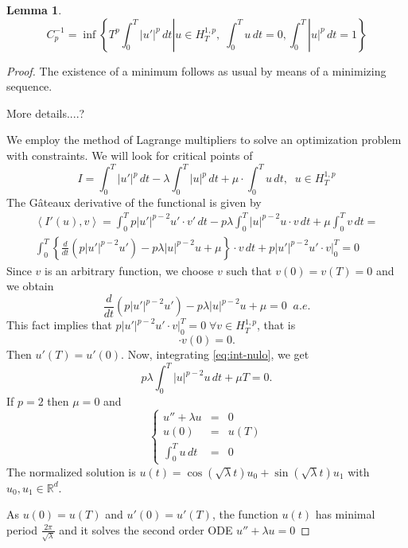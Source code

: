 \documentclass[twoside]{article}
\newtheorem{lem}[thm]{Lemma}
\theoremstyle{remark}
\newcommand{\rr}{\mathbb{R}}
\begin{document}
\begin{lem}
\begin{equation}
C_p^{-1}=\inf \left\{T^p \int_0^T |u'|^p\,dt | u\in H^{1,p}_T,\;\int_0^T u\,dt=0, 
\int_0^T |u|^p\,dt=1\right\}
\end{equation}
\end{lem}
\begin{proof}
The existence of a minimum follows as usual by means of a minimizing sequence. 

More details....?

We employ the method of Lagrange multipliers to solve an optimization problem with constraints. 
We will look for critical points of 
\begin{equation}
I=\int_0^T |u'|^p\,dt-\lambda \int_0^T |u|^p\,dt+\mu \cdot \int_0^T u\,dt,\;\; u\in H^{1,p}_T 
\end{equation}
The G\^ateaux derivative of the functional is given by
\begin{equation}
\begin{split}
\left\langle I'(u),v\right\rangle=
\int_0^T p |u'|^{p-2}u'\cdot v'\,dt-p\lambda \int_0^T |u|^{p-2}u\cdot v\,dt+ \mu \int_0^T v\,dt=
\\
\int_0^T \left\{\frac{d}{dt}(p |u'|^{p-2}u')-p\lambda |u|^{p-2}u+\mu\right\}\cdot v\,dt+p |u'|^{p-2}u'\cdot v|_0^T=0
\end{split}
\end{equation}
Since $v$ is an arbitrary function, we choose $v$ such that $v(0)=v(T)=0$ and we obtain 
\begin{equation}\label{eq:int-nulo}
\frac{d}{dt}(p |u'|^{p-2}u')-p\lambda |u|^{p-2}u+\mu=0 \;\;a.e.
\end{equation}
This fact implies that 
$p |u'|^{p-2}u'\cdot v|_0^T=0 \; \forall v \in H^{1,p}_T$, that is
 \begin{equation}
[p |u'(T)|^{p-2}u'(T)-p|u'(0)|^{p-2}u'(0)]\cdot v(0)=0.
\end{equation}
Then $u'(T)=u'(0)$. 
Now, integrating \eqref{eq:int-nulo}, we get
\[
p\lambda \int_0^T |u|^{p-2}u\,dt+\mu T=0.
\]
If $p=2$ then $\mu=0$ and 
\[
\left\{
\begin{array}{lll}
u''+ \lambda u&=&0\\
u(0)&=&u(T)\\
\int_0^T u\,dt&=&0
\end{array}
\right.
\]
The normalized solution is
$u(t)=\cos(\sqrt\lambda t)u_0+\sin(\sqrt\lambda t)u_1$
with $u_0,u_1\in \rr^d$.

As $u(0)=u(T)$ and $u'(0)=u'(T)$, 
the function $u(t)$ has minimal  period $\frac{2\pi}{\sqrt \lambda}$ and it solves the second order ODE 
$u''+ \lambda u=0$


\end{proof}
\end{document}
